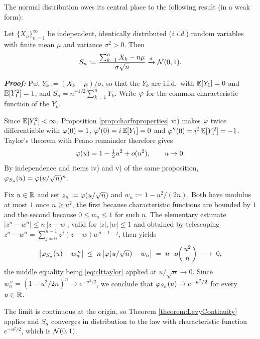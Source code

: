 The normal distribution owes its central place to the following result (in a weak form):

\begin{theorem}\label{thm:clt}
    Let $\{X_n\}_{n=1}^\infty$ be independent, identically distributed (\emph{i.i.d.}) random variables with finite mean $\mu$ and variance $\sigma^2 > 0$. Then
    \begin{equation}\label{eq:clt}
    S_n := \frac{\sum_{k=1}^n X_k - n\mu}{\sigma \sqrt{n}} \xrightarrow{d} \mathcal{N}(0,1).
    \end{equation}
\end{theorem}

\textbf{\textit{Proof:}} Put $Y_k := (X_k - \mu)/\sigma$, so that the $Y_k$ are i.i.d.\ with
$\mathbb{E}[Y_1] = 0$ and $\mathbb{E}[Y_1^2]=1$, and $S_n = n^{-1/2}\sum_{k=1}^n Y_k$. Write $\varphi$ for the common
characteristic function of the $Y_k$.

Since $\mathbb{E}[Y_1^2] < \infty$, Proposition \ref{prop:charfnproperties} vi) makes $\varphi$ twice
differentiable with $\varphi(0)=1$, $\varphi'(0) = i\,\mathbb{E}[Y_1] = 0$ and
$\varphi''(0) = i^2\,\mathbb{E}[Y_1^2] = -1$. Taylor's theorem with Peano remainder therefore gives
\begin{equation}\label{eq:clttaylor}
\varphi(u) = 1 - \tfrac{1}{2}u^2 + o(u^2), \qquad u \to 0 .
\end{equation}
By independence and items iv) and v) of the same proposition, $\varphi_{S_n}(u) = \varphi(u/\sqrt n)^n$.

Fix $u \in \mathbb{R}$ and set $z_n := \varphi(u/\sqrt n)$ and $w_n := 1 - u^2/(2n)$. Both have modulus at
most $1$ once $n \geq u^2$, the first because characteristic functions are bounded by $1$ and the
second because $0 \leq w_n \leq 1$ for such $n$. The elementary estimate
$|z^n - w^n| \leq n\,|z-w|$, valid for $|z|,|w|\leq1$ and obtained by telescoping
$z^n - w^n = \sum_{j=0}^{n-1} z^{j}(z-w)w^{n-1-j}$, then yields
\[
\bigl| \varphi_{S_n}(u) - w_n^{\,n} \bigr| \;\leq\; n\,\bigl|\varphi(u/\sqrt n) - w_n\bigr|
\;=\; n \cdot o\!\left(\frac{u^2}{n}\right) \;\longrightarrow\; 0 ,
\]
the middle equality being \eqref{eq:clttaylor} applied at $u/\sqrt n \to 0$. Since
$w_n^{\,n} = (1-u^2/2n)^n \to e^{-u^2/2}$, we conclude that
$\varphi_{S_n}(u) \to e^{-u^2/2}$ for every $u \in \mathbb{R}$.

The limit is continuous at the origin, so Theorem \ref{theorem:LevyContinuity} applies and
$S_n$ converges in distribution to the law with characteristic function $e^{-u^2/2}$, which is
$\mathcal{N}(0,1)$. \qedfilledtext

